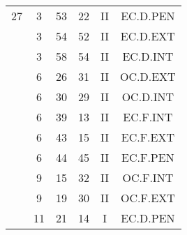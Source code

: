 \documentclass[12pt, a4paper]{article}
\begin{document}
\begin{multicols}{3}
{\begin{tabular}{c c c c c c}
	 	 	 	27 & 3 & 53 & 22 & II & EC.D.PEN\\%
	 	 	 	 & 3 & 54 & 52 & II & EC.D.EXT\\%
	 	 	 	 & 3 & 58 & 54 & II & EC.D.INT\\%
	 	 	 	 & 6 & 26 & 31 & II & OC.D.EXT\\%
	 	 	 	 & 6 & 30 & 29 & II & OC.D.INT\\%
	 	 	 	 & 6 & 39 & 13 & II & EC.F.INT\\%
	 	 	 	 & 6 & 43 & 15 & II & EC.F.EXT\\%
	 	 	 	 & 6 & 44 & 45 & II & EC.F.PEN\\%
	 	 	 	 & 9 & 15 & 32 & II & OC.F.INT\\%
	 	 	 	 & 9 & 19 & 30 & II & OC.F.EXT\\%
	 	 	 	 & 11 & 21 & 14 & I & EC.D.PEN\\%
	 	 \end{tabular}
 	}
\end{multicols}
\end{document}
